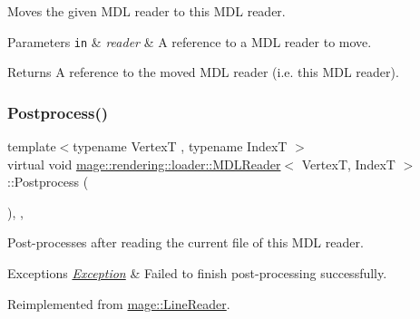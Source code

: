 Moves the given M\+DL reader to this M\+DL reader.


\begin{DoxyParams}[1]{Parameters}
\mbox{\tt in}  & {\em reader} & A reference to a M\+DL reader to move. \\
\hline
\end{DoxyParams}
\begin{DoxyReturn}{Returns}
A reference to the moved M\+DL reader (i.\+e. this M\+DL reader). 
\end{DoxyReturn}
\mbox{\label{classmage_1_1rendering_1_1loader_1_1_m_d_l_reader_abbff75b1926904c6c0bcb0aeae8f3fdc}} 
\subsubsection{\texorpdfstring{Postprocess()}{Postprocess()}}
{\footnotesize\ttfamily template$<$typename VertexT , typename IndexT $>$ \\
virtual void \mbox{\hyperlink{classmage_1_1rendering_1_1loader_1_1_m_d_l_reader}{mage\+::rendering\+::loader\+::\+M\+D\+L\+Reader}}$<$ VertexT, IndexT $>$\+::Postprocess (\begin{DoxyParamCaption}{ }\end{DoxyParamCaption})\hspace{0.3cm}{\ttfamily [override]}, {\ttfamily [private]}, {\ttfamily [virtual]}}

Post-\/processes after reading the current file of this M\+DL reader.


\begin{DoxyExceptions}{Exceptions}
{\em \mbox{\hyperlink{classmage_1_1_exception}{Exception}}} & Failed to finish post-\/processing successfully. \\
\hline
\end{DoxyExceptions}


Reimplemented from \mbox{\hyperlink{classmage_1_1_line_reader_a51775e07b5f7c9f72441e42d6d3896e1}{mage\+::\+Line\+Reader}}.

\mbox{\label{classmage_1_1rendering_1_1loader_1_1_m_d_l_reader_a397f0c0eedc56c983fc3a7074aa4e577}} 
